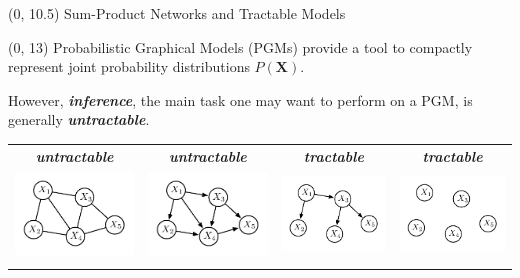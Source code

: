 \documentclass[final]{beamer}
\begin{document}
\begin{frame}{}
  
  \begin{textblock}{80}(0, 10.5)
    Sum-Product Networks and Tractable Models
  \end{textblock}
  
  
  \begin{textblock}{25.2}(0, 13)
    \footnotesize
    Probabilistic Graphical Models (PGMs) provide a tool to compactly
    represent joint probability distributions $P(\mathbf{X})$.

    However, \emph{\textbf{inference}}, the main task one may want to perform on a PGM, is generally \emph{\textbf{untractable}}.\bigskip  
    \begin{table}[!ht]
      \setlength{\tabcolsep}{10pt}
      \centering
      \begin{tabular}{c c c c}
        \scriptsize\color{untractable_red}  \textbf{\emph{untractable}} & \scriptsize\color{untractable_red} \textbf{\emph{untractable}}& \scriptsize\color{tractable_green} \emph{\textbf{tractable}} & \scriptsize\color{tractable_green} \emph{\textbf{tractable}}\\

        
        \includegraphics[width=0.22\linewidth]{figures/mrf} &
        \includegraphics[width=0.22\linewidth]{figures/bn} &
        \includegraphics[width=0.22\linewidth]{figures/clt} &
        \includegraphics[width=0.22\linewidth]{figures/nf}\\                                                             
        \addlinespace[-0.2cm]
                                                                            

\end{tabular}
\end{table}
\end{textblock}
\end{frame}
\end{document}
